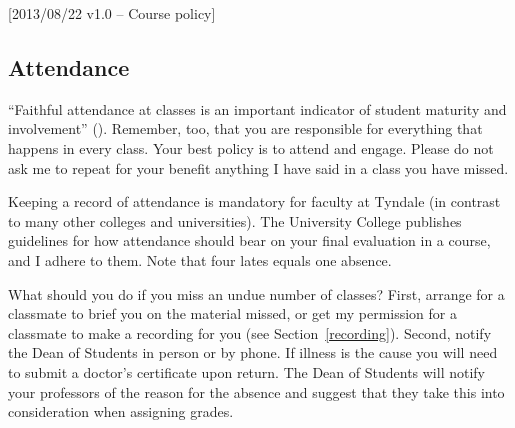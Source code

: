 [2013/08/22 v1.0 -- Course policy]

\subsection{Attendance}
\label{attendance}

``Faithful attendance at classes is an important indicator of student maturity
and involvement'' (\AC). Remember, too, that you are responsible for everything
that happens in every class. Your best policy is to attend and engage. Please
do not ask me to repeat for your benefit anything I have said in a class you
have missed.

Keeping a record of attendance is mandatory for faculty at Tyndale (in contrast
to many other colleges and universities). The University College publishes
guidelines for how attendance should bear on your final evaluation in a course,
and I adhere to them. Note that four lates equals one absence.

What should you do if you miss an undue number of classes? First, arrange for
a classmate to brief you on the material missed, or get my permission for a
classmate to make a recording for you (see Section~\ref{recording}). Second,
notify the Dean of Students in person or by phone. If illness is the cause you
will need to submit a doctor's certificate upon return. The Dean of Students
will notify your professors of the reason for the absence and suggest that they
take this into consideration when assigning grades.
